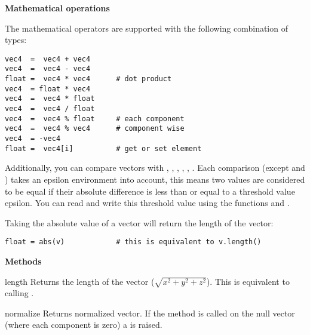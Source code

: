 {\bf Mathematical operations}

The mathematical operators are supported with the following
combination of types:

\begin{verbatim}
vec4  =  vec4 + vec4
vec4  =  vec4 - vec4
float =  vec4 * vec4      # dot product
vec4  = float * vec4
vec4  =  vec4 * float
vec4  =  vec4 / float
vec4  =  vec4 % float     # each component
vec4  =  vec4 % vec4      # component wise
vec4  = -vec4
float =  vec4[i]          # get or set element
\end{verbatim}

Additionally, you can compare vectors with \code{==}, \code{!=}, \code{<}, 
\code{<=}, \code{>}, \code{>=}. Each
comparison (except \code{<} and \code{>}) takes an epsilon environment
into account, this means two values are considered to be equal if
their absolute difference is less than or equal to a threshold value
epsilon. You can read and write this threshold value using the
functions  and .

Taking the absolute value of a vector will return the length of the vector: 

\begin{verbatim}
float = abs(v)            # this is equivalent to v.length()
\end{verbatim}

{\bf Methods}

\begin{methoddesc}{length}{}
Returns the length of the vector ($\sqrt{x^2+y^2+z^2}$). This is
equivalent to calling .
\end{methoddesc}

\begin{methoddesc}{normalize}{}
Returns normalized vector. If the method is called on the null vector
(where each component is zero) a  is raised.
\end{methoddesc}


